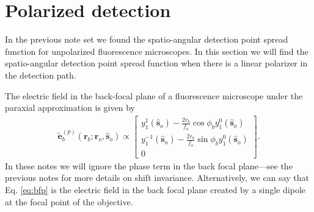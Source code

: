 \documentclass[11pt]{article}
\providecommand{\mb}[1]{\mathbf{#1}}
\providecommand{\ro}[1]{\mathbf{\mathbf{r}}_o}
\providecommand{\so}[1]{\mathbf{\hat{s}}_o}
\providecommand{\rb}[1]{\mathbf{r}_b}
\begin{document}
\section{Polarized detection}
In the previous note set we found the spatio-angular detection point spread
function for unpolarized fluorescence microscopes. In this section we will find
the spatio-angular detection point spread function when there is a linear
polarizer in the detection path.

The electric field in the back-focal plane of a fluorescence microscope under
the paraxial approximation is given by
\begin{align}
   \mb{\tilde{e}}^{(p)}_b(\rb{};\ro{}, \so{}) \propto
  \begin{bmatrix}
    y_1^1(\so{}) -\frac{2r_b}{f_o}\cos\phi_by_1^0(\so{})\\
    y_1^{-1}(\so{}) -\frac{2r_b}{f_o}\sin\phi_by_1^0(\so{})\\
    0
  \end{bmatrix}.\label{eq:bfp}
\end{align}
In these notes we will ignore the phase term in the back focal plane---see the
previous notes for more details on shift invariance. Alternatively, we can say
that Eq. \ref{eq:bfp} is the electric field in the back focal plane created by a
single dipole at the focal point of the objective.
\end{document}
